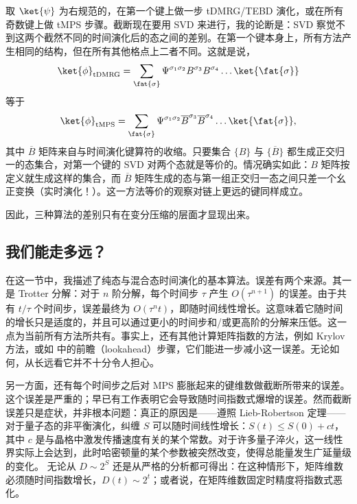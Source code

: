取 $\ket{\psi}$ 为右规范的，在第一个键上做一步 tDMRG/TEBD 演化，或在所有奇数键上做 tMPS 步骤。截断现在要用 SVD 来进行，我的论断是：SVD 察觉不到这两个截然不同的时间演化后的态之间的差别。在第一个键本身上，所有方法产生相同的结构，但在所有其他格点上二者不同。这就是说，
\begin{equation}
\ket{\phi}_{{\rm tDMRG}} = \sum_{\fat{\sigma}} \Psi^{\sigma_1\sigma_2} B^{\sigma_3} B^{\sigma_4} \ldots \ket{\fat{\sigma}}  
\end{equation}
等于 
\begin{equation}
\ket{\phi}_{{\rm tMPS}} = \sum_{\fat{\sigma}} \Psi^{\sigma_1\sigma_2} \overline{B}^{\sigma_3} \overline{B}^{\sigma_4} \ldots \ket{\fat{\sigma}}  ,
\end{equation}
其中 $\overline{B}$ 矩阵来自与时间演化键算符的收缩。只要集合 $\{ B \}$ 与 $\{ \overline{B} \}$ 都生成正交归一的态集合，对第一个键的 SVD 对两个态就是等价的。情况确实如此：$B$ 矩阵按定义就生成这样的集合，而 $\overline{B}$ 矩阵生成的态与第一组正交归一态之间只差一个幺正变换（实时演化！）。这一方法等价的观察对链上更远的键同样成立。

因此，三种算法的差别只有在变分压缩的层面才显现出来。
 
\subsection{我们能走多远？} 
在这一节中，我描述了纯态与混合态时间演化的基本算法。误差有两个来源。其一是 Trotter 分解：对于 $n$ 阶分解，每个时间步 $\tau$ 产生 $O(\tau^{n+1})$ 的误差。由于共有 $t/\tau$ 个时间步，误差最终为 $O(\tau^n t)$，即随时间线性增长。这意味着它随时间的增长只是适度的，并且可以通过更小的时间步和/或更高阶的分解来压低。这一点为当前所有方法所共有\cite{Vidal03a,Vidal04b,Daley04,WhiteFeiguin04,VerstraeteRipoll04}。事实上，还有其他计算矩阵指数的方法，例如 Krylov 方法\cite{Schmitteckert04}，或如 \cite{Feiguin05} 中的前瞻（lookahead）步骤，它们能进一步减小这一误差。无论如何，从长远看它并不十分令人担心。 

另一方面，还有每个时间步之后对 MPS 膨胀起来的键维数做截断所带来的误差。这个误差是严重的；早已有工作表明它会导致随时间指数式爆增的误差\cite{Gobert05}。然而截断误差只是症状，并非根本问题：真正的原因是——遵照 Lieb-Robertson 定理——对于量子态的非平衡演化，纠缠 $S$ 可以随时间线性增长：$S(t) \leq S(0) + c t$，其中 $c$ 是与晶格中激发传播速度有关的某个常数\cite{Calabrese06}。对于许多量子淬火，这一线性界实际上会达到，此时哈密顿量的某个参数被突然改变，使得总能量发生广延量级的变化。
无论从 $D \sim 2^S$ 还是从严格的分析\cite{Osborne06}都可得出：在这种情形下，矩阵维数必须随时间指数增长，$D(t) \sim 2^t$；或者说，在矩阵维数固定时精度将指数式恶化。 

